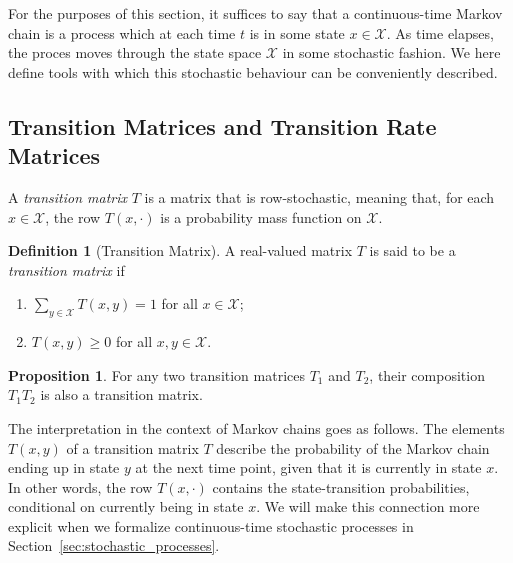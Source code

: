 \documentclass[10pt,a4paper]{paper}
\theoremstyle{definition}
\newtheorem{proposition}[theorem]{Proposition}
\newtheorem{definition}{Definition}
\newcommand{\states}{\mathcal{X}}
\begin{document}
For the purposes of this section, it suffices to say that a continuous-time Markov chain is a process which at each time $t$ is in some state $x\in\states$. As time elapses, the proces moves through the state space $\states$ in some stochastic fashion. We here define tools with which this stochastic behaviour can be conveniently described.

\subsection{Transition Matrices and Transition Rate Matrices}\label{sec:trans_rate_matrices}

A \emph{transition matrix} $T$ is a matrix that is row-stochastic, meaning that, for each $x\in\states$, the row $T(x,\cdot)$ is a probability mass function on $\states$.
\begin{definition}[Transition Matrix]\label{def:stoch_matrix}
A real-valued matrix $T$ is said to be a \emph{transition matrix} if
\vspace{5pt}
\begin{enumerate}[label=T\arabic*:,ref=T\arabic*]
\item\label{def:T:sumone}
$\sum_{y\in\states}T(x,y)=1$ for all $x\in\states$;\label{def:trans_matrix_is_stochastic}
\item\label{def:T:nonneg}
$T(x,y)\geq0$ for all $x,y\in\states$.
\end{enumerate}
\vspace{5pt}
\noindent
\end{definition}

\begin{proposition}\label{lemma:compositiontransitionmatrix}
For any two transition matrices $T_1$ and $T_2$, their composition $T_1T_2$ is also a transition matrix.
\end{proposition}

The interpretation in the context of Markov chains goes as follows. The elements $T(x,y)$ of a transition matrix $T$ describe the probability of the Markov chain ending up in state $y$ at the next time point, given that it is currently in state $x$. In other words, the row $T(x,\cdot)$ contains the state-transition probabilities, conditional on currently being in state $x$. We will make this connection more explicit when we formalize continuous-time stochastic processes in Section~\ref{sec:stochastic_processes}.
\end{document}
